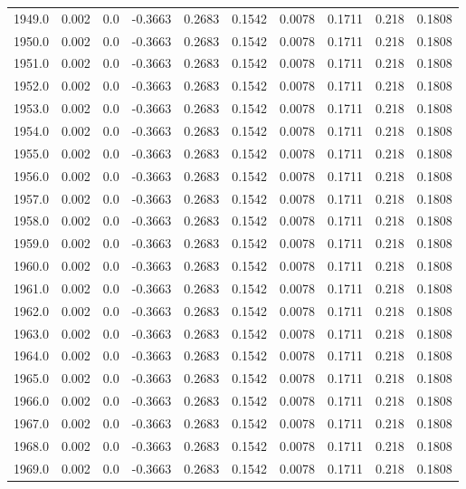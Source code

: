 \begin{longtable}{lrrrrrrrrr}
1949.0 & 0.002 & 0.0 & -0.3663 & 0.2683 & 0.1542 & 0.0078 & 0.1711 & 0.218 & 0.1808 \\
1950.0 & 0.002 & 0.0 & -0.3663 & 0.2683 & 0.1542 & 0.0078 & 0.1711 & 0.218 & 0.1808 \\
1951.0 & 0.002 & 0.0 & -0.3663 & 0.2683 & 0.1542 & 0.0078 & 0.1711 & 0.218 & 0.1808 \\
1952.0 & 0.002 & 0.0 & -0.3663 & 0.2683 & 0.1542 & 0.0078 & 0.1711 & 0.218 & 0.1808 \\
1953.0 & 0.002 & 0.0 & -0.3663 & 0.2683 & 0.1542 & 0.0078 & 0.1711 & 0.218 & 0.1808 \\
1954.0 & 0.002 & 0.0 & -0.3663 & 0.2683 & 0.1542 & 0.0078 & 0.1711 & 0.218 & 0.1808 \\
1955.0 & 0.002 & 0.0 & -0.3663 & 0.2683 & 0.1542 & 0.0078 & 0.1711 & 0.218 & 0.1808 \\
1956.0 & 0.002 & 0.0 & -0.3663 & 0.2683 & 0.1542 & 0.0078 & 0.1711 & 0.218 & 0.1808 \\
1957.0 & 0.002 & 0.0 & -0.3663 & 0.2683 & 0.1542 & 0.0078 & 0.1711 & 0.218 & 0.1808 \\
1958.0 & 0.002 & 0.0 & -0.3663 & 0.2683 & 0.1542 & 0.0078 & 0.1711 & 0.218 & 0.1808 \\
1959.0 & 0.002 & 0.0 & -0.3663 & 0.2683 & 0.1542 & 0.0078 & 0.1711 & 0.218 & 0.1808 \\
1960.0 & 0.002 & 0.0 & -0.3663 & 0.2683 & 0.1542 & 0.0078 & 0.1711 & 0.218 & 0.1808 \\
1961.0 & 0.002 & 0.0 & -0.3663 & 0.2683 & 0.1542 & 0.0078 & 0.1711 & 0.218 & 0.1808 \\
1962.0 & 0.002 & 0.0 & -0.3663 & 0.2683 & 0.1542 & 0.0078 & 0.1711 & 0.218 & 0.1808 \\
1963.0 & 0.002 & 0.0 & -0.3663 & 0.2683 & 0.1542 & 0.0078 & 0.1711 & 0.218 & 0.1808 \\
1964.0 & 0.002 & 0.0 & -0.3663 & 0.2683 & 0.1542 & 0.0078 & 0.1711 & 0.218 & 0.1808 \\
1965.0 & 0.002 & 0.0 & -0.3663 & 0.2683 & 0.1542 & 0.0078 & 0.1711 & 0.218 & 0.1808 \\
1966.0 & 0.002 & 0.0 & -0.3663 & 0.2683 & 0.1542 & 0.0078 & 0.1711 & 0.218 & 0.1808 \\
1967.0 & 0.002 & 0.0 & -0.3663 & 0.2683 & 0.1542 & 0.0078 & 0.1711 & 0.218 & 0.1808 \\
1968.0 & 0.002 & 0.0 & -0.3663 & 0.2683 & 0.1542 & 0.0078 & 0.1711 & 0.218 & 0.1808 \\
1969.0 & 0.002 & 0.0 & -0.3663 & 0.2683 & 0.1542 & 0.0078 & 0.1711 & 0.218 & 0.1808 \\

\end{longtable}
